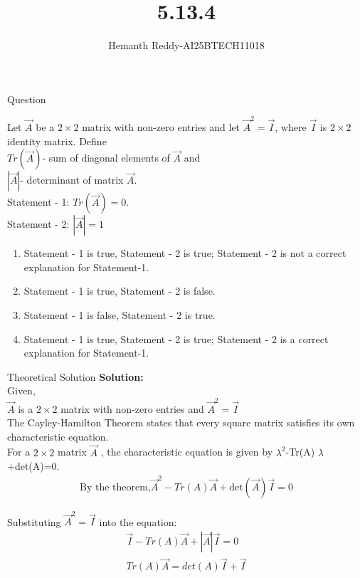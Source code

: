 \documentclass{beamer}
\title %
{5.13.4}
\author %
{Hemanth Reddy-AI25BTECH11018}
\begin{document}
\frame{\titlepage}
\begin{frame}{Question}

    Let $\vec{A}$ be a $2\times2$ matrix with non-zero entries and let $\vec{A}^2 = \vec{I}$, where $\vec{I}$ is $2\times2$ identity matrix. Define \\
    $Tr(\vec{A})$- sum of diagonal elements of $\vec{A}$ and\\
    $|\vec{A}|$- determinant of matrix $\vec{A}$.\\
    Statement - 1: $Tr(\vec{A}) = 0$.\\
    Statement - 2: $|\vec{A}| = 1$\\


\begin{enumerate}
    \item Statement - 1 is true, Statement - 2 is true; Statement - 2 is not a correct explanation for Statement-1.
    \item Statement - 1 is true, Statement - 2 is false.
   \item Statement - 1 is false, Statement - 2 is true.

 \item Statement - 1 is true, Statement - 2 is true; Statement - 2 is a correct explanation for Statement-1.

\end{enumerate}

\end{frame}



\begin{frame}{Theoretical Solution}
\textbf{Solution:}\\

Given,\\
$\vec{A}$ is a $2\times2$ matrix with non-zero entries and $\vec{A}^2 = \vec{I}$\\
The Cayley-Hamilton Theorem states that every square matrix satisfies its own characteristic equation.\\

For a $2\times2$ matrix $\vec{A}$ , the characteristic equation is given by $\lambda^2$-Tr(A) $\lambda$+det(A)=0.\\
\begin{align}
    \text{By the theorem,}  \vec{A}^2 -Tr(A) \vec{A} +\text{det}(\vec{A}) \vec{I} =0
\end{align}



Substituting $\vec{A}^2 = \vec{I}$ into the equation:\\
\begin{align}
      \vec{I}  - Tr(A) \vec{A} + |\vec{A}|\vec{I} =0\\
   Tr(A) \vec{A} =det(A) \vec{I} +  \vec{I}  
\end{align}
   

\end{frame}
\end{document}
